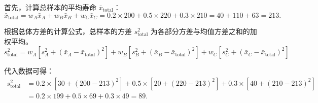 \begin{solution}
    首先，计算总样本的平均寿命 $\bar{x}_{\text{total}}$：
    $$
        \bar{x}_{\text{total}} = w_A\bar{x}_A + w_B\bar{x}_B + w_C\bar{x}_C = 0.2 \times 200 + 0.5 \times 220 + 0.3 \times 210 = 40 + 110 + 63 = 213.
    $$

    根据总体方差的计算公式，总样本的方差 $s_{\text{total}}^2$ 为各部分方差与均值方差之和的加权平均。
    $$
        s_{\text{total}}^2 = w_A\left[s_A^2 + (\bar{x}_A - \bar{x}_{\text{total}})^2\right] + w_B\left[s_B^2 + (\bar{x}_B - \bar{x}_{\text{total}})^2\right] + w_C\left[s_C^2 + (\bar{x}_C - \bar{x}_{\text{total}})^2\right]
    $$

    代入数据可得：
    \begin{align*}
        s_{\text{total}}^2 & = 0.2 \times \left[30 + (200 - 213)^2\right] + 0.5 \times \left[20 + (220 - 213)^2\right] + 0.3 \times \left[40 + (210 - 213)^2\right] \\
                           & = 0.2 \times 199 + 0.5 \times 69 + 0.3 \times 49 = 89.
    \end{align*}
\end{solution}
